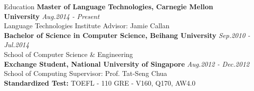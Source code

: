 \documentclass{resume} %
\begin{document}

\begin{rSection}{Education}
{\bf Master of Language Technologies, Carnegie Mellon University} \hfill {\em Aug.2014 - Present} \\
Language Technologies Institute \hfill Advisor: Jamie Callan \\
{\bf Bachelor of Science in Computer Science, Beihang University} \hfill {\em Sep.2010 - Jul.2014} \\
School of Computer Science \& Engineering \\
{\bf Exchange Student, National University of Singapore} \hfill {\em Aug.2012 - Dec.2012} \\
School of Computing \hfill Supervisor: Prof. Tat-Seng Chua \\
{\bf Standardized Test: } TOEFL - 110 GRE - V160,  Q170, AW4.0

\end{rSection}

\end{document}
